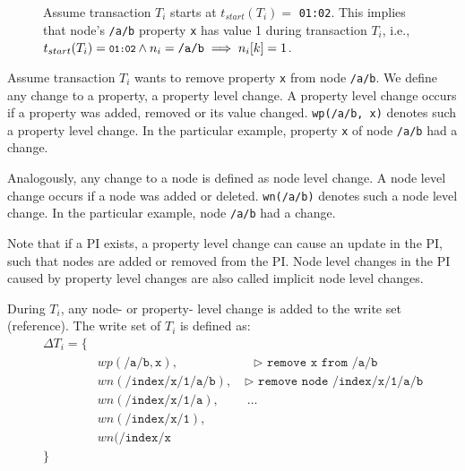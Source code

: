 \documentclass[abstracton,12pt]{scrreprt}
\newenvironment{centerverbatim}{\par\centering\varwidth{\linewidth}\verbatim}
    {\endverbatim\endvarwidth\par}
\begin{document}
\begin{figure}[h]
    \label{fig:read_example}
    \begin{scriptsize}
        \begin{centerverbatim}
[
    { "_id": "0:/", /* ... */ },
    { "_id": "2:/a/b", "x": {
            "r15e830cae80-0-1": 0, /* 01:00 */
            "r15e830d98e0-0-1": 1, /* 01:01 */
            "r15e830f6da0-0-2": 2, /* 01:03 */
        },
        /* ... */
    },
    /* ... */
]
        \end{centerverbatim}
    \end{scriptsize}
    \caption{
        Assume transaction $T_i$ starts at $t_{start}(T_i) =$ {\footnotesize\texttt{01:02}}.
        This implies that node's \texttt{/a/b} property \texttt{x} has value 1 during transaction $T_i$,
        i.e., $ t_{start}(T_i) = \texttt{\footnotesize01:02} \land n_i = \texttt{/a/b} \implies n_i[k] = 1$.
    }
\end{figure}

Assume transaction $T_i$ wants to remove property \texttt{x} from node \texttt{/a/b}.
We define any change to a property, a property level change.
A property level change occurs if a property was added, removed or its value changed.
\texttt{wp(/a/b, x)} denotes such a property level change.
In the particular example, property \texttt{x} of node \texttt{/a/b} had a change.

Analogously, any change to a node is defined as node level change.
A node level change occurs if a node was added or deleted.
\texttt{wn(/a/b)} denotes such a node level change.
In the particular example, node \texttt{/a/b} had a change.

Note that if a PI exists, a property level change can cause an update in the PI, such that nodes are added or removed from the PI.
Node level changes in the PI caused by property level changes are also called implicit node level changes.

During $T_i$, any node- or property- level change is added to the write set (reference).
The write set of $T_i$ is defined as:
\begin{equation}
    \begin{split}
\Delta T_i = \{\\
    & wp(\texttt{/a/b}, \texttt{x}), \qquad \qquad \qquad \texttt{$\triangleright$ remove x from /a/b}\\
    & wn(\texttt{/index/x/1/a/b}),\quad \texttt{$\triangleright$ remove node /index/x/1/a/b}\\
    & wn(\texttt{/index/x/1/a}), \qquad \ \dots\\
    & wn(\texttt{/index/x/1}),\\
    & wn(\texttt{/index/x} \\
        \}
    \end{split}
\end{equation}
\end{document}
